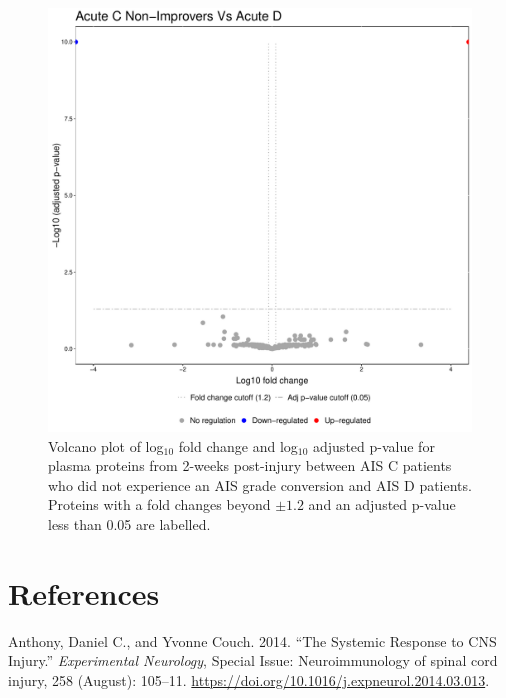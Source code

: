 \documentclass[9pt,lineno]{elife}
\newlength{\cslhangindent}
\newlength{\cslentryspacingunit} %
\newenvironment{CSLReferences}[2] %
 {%
  \setlength{\parindent}{0pt}
  \ifodd #1
  \let\oldpar\par
  \def\par{\hangindent=\cslhangindent\oldpar}
  \fi
  \setlength{\parskip}{#2\cslentryspacingunit}
 }%
 {}
\begin{document}
\begin{landscape}
\begin{landscape}
\begin{landscape}
\begin{landscape}
\begin{figure}
\includegraphics[width=1\linewidth]{figures/openms_protein_quantification/label_free/volcano_plots/openms_volcano_plot_2021-08-10_0014} \caption{Volcano plot of log\(_10\) fold change and log\(_10\) adjusted p-value for plasma proteins from 2-weeks post-injury between AIS C patients who did not experience an AIS grade conversion and AIS D patients. Proteins with a fold changes beyond \(\pm 1.2\) and an adjusted p-value less than 0.05 are labelled.}\label{fig:volc-plot-acute-c-nonimp-vs-acute-d}
\end{figure}

\hypertarget{references}{%
\section*{References}\label{references}}

\hypertarget{refs}{}
\begin{CSLReferences}{1}{0}
\leavevmode{}%
Anthony, Daniel C., and Yvonne Couch. 2014. {``The Systemic Response to {CNS} Injury.''} \emph{Experimental Neurology}, Special {Issue}: {Neuroimmunology} of spinal cord injury, 258 (August): 105--11. \url{https://doi.org/10.1016/j.expneurol.2014.03.013}.


\end{CSLReferences}
\end{landscape}
\end{landscape}
\end{landscape}
\end{landscape}
\end{document}

